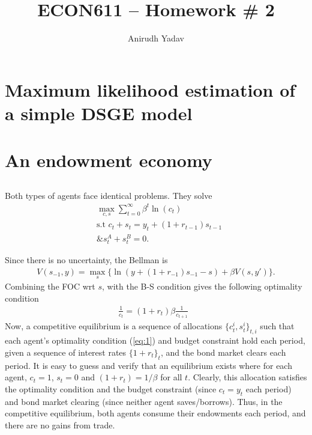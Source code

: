 \documentclass[12pt]{article}
\title{ECON611 -- Homework \# 2}
\author{Anirudh Yadav}
\begin{document}
\maketitle


\section{Maximum likelihood estimation of a simple DSGE model}

\newpage

\section{An endowment economy}

\subsection{}
Both types of agents face identical problems. They solve
\begin{align*}
&\max_{c, s} \sum_{t=0}^\infty \beta^t \ln(c_t)\\
&\text{s.t } c_t + s_t = y_t + (1+r_{t-1})s_{t-1}\\
&\text{\& } s^A_t + s^B_t = 0.
\end{align*}

Since there is no uncertainty, the Bellman is 
\begin{align*}
V(s_{-1} , y) = \max_s \{ \ln(y+(1+r_{-1})s_{-1} - s) + \beta V(s,y')\}.
\end{align*}
Combining the FOC wrt $s$, with the B-S condition gives the following optimality condition
\begin{align}
\frac{1}{c_t} = (1+r_t)\beta \frac{1}{c_{t+1}} \text{ } \label{eq:1}
\end{align}
Now, a competitive equilibrium is a sequence of allocations $\{c^i_t, s^i_t\}_{t,i}$ such that each agent's optimality condition (\ref{eq:1}) and budget constraint hold each period, given a sequence of interest rates $\{1+r_t\}_t$, and the bond market clears each period. It is easy to guess and verify that an equilibrium exists where for each agent, $c_t = 1$, $s_t = 0$ and $(1+r_t) = 1/\beta$ for all $t$. Clearly, this allocation satisfies the optimality condition and the budget constraint (since $c_t = y_t$ each period) and bond market clearing (since neither agent saves/borrows). Thus, in the competitive equilibrium, both agents consume their endowments each period, and there are no gains from trade.
\end{document}
